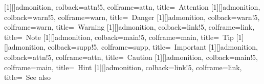 \newcommand{\missingfigure}[1]{%
  \fbox{\parbox[c][1.25in][c]{0.8\linewidth}{\centering\color{warn}%
    \faExclamationTriangle{}~Missing figure\\[0.5ex]{\footnotesize\texttt{\detokenize{#1}}}}}}

\usepackage[most]{tcolorbox}
[1][]{admonition, colback=attn!5, colframe=attn,
  title={\faExclamationCircle{}~Attention}}
[1][]{admonition, colback=warn!5, colframe=warn,
  title={\faExclamationTriangle{}~Danger}}
[1][]{admonition, colback=warn!5, colframe=warn,
  title={\faExclamationTriangle{}~Warning}}
[1][]{admonition, colback=link!5, colframe=link,
  title={\faInfoCircle{}~Note}}
[1][]{admonition, colback=main!5, colframe=main,
  title={\faLightbulb{}~Tip}}
[1][]{admonition, colback=supp!5, colframe=supp,
  title={\faExclamationCircle{}~Important}}
[1][]{admonition, colback=attn!5, colframe=attn,
  title={\faExclamationTriangle{}~Caution}}
[1][]{admonition, colback=main!5, colframe=main,
  title={\faLightbulb{}~Hint}}
[1][]{admonition, colback=link!5, colframe=link,
  title={\faBookOpen{}~See also}}


\usepackage{comment}
\ifdefined\hidesolutions
\else
\fi

